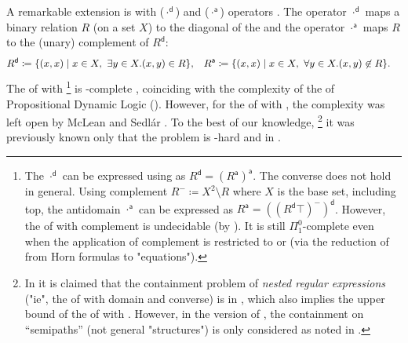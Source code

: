 \documentclass[10pt,a4paper]{article}
\theoremstyle{definition}
\theoremstyle{remark}
\DeclarePairedDelimiter\set{\{}{\}}
\DeclarePairedDelimiter\tuple{(}{)}
\newcommand{\bl}{\cdot}
\newcommand{\defeq}{\coloneq}
\newcommand{\dom}{\mathsf{d}}
\begin{document}
\begin{scope}
A remarkable extension is  with \reintro*{} ($\bl^{\mathsf{d}}$) and \intro*{} ($\bl^{\mathsf{a}}$) operators \cite{desharnaisKleeneAlgebraDomain2006,desharnaisModalSemiringsRevisited2008,desharnaisInternalAxiomsDomain2011}.
The  operator $\bl^{\mathsf{d}}$ maps a binary relation $R$ (on a set $X$) to the diagonal of the 
and the  operator $\bl^{\mathsf{a}}$ maps $R$ to the (unary) complement of $R^{\mathsf{d}}$:
\begin{align*}
  R^{\mathsf{d}} &\defeq \set{ \tuple{x,x} \mid x \in X,~ \exists y \in X. \tuple{x,y} \in R}, &
  R^{\mathsf{a}} &\defeq \set{ \tuple{x,x} \mid x \in X,~ \forall y \in X. \tuple{x,y} \not\in R}.
\end{align*}
%
The  of  with %
\footnote{\label{footnote: undecidable}%
The  $\bl^{\dom}$ can be expressed using  as $R^{\mathsf{d}} = (R^{\mathsf{a}})^{\mathsf{a}}$.
The converse does not hold in general.
Using complement $R^{-} \defeq X^2 \setminus R$ where $X$ is the base set, including top,
the antidomain $\bl^{\mathsf{a}}$ can be expressed as $R^{\mathsf{a}} = ((R^{\mathsf{d}} \top)^{-})^{\mathsf{d}}$.
However, the  of  with complement is undecidable (by \cite{hardinComplexityHornTheory2003}).
It is still $\Pi^{0}_{1}$-complete even when the application of complement is restricted to  \cite[Corollary 7.2]{nakamuraUndecidabilityEmptinessProblem2025} or  \cite[Theorem 50]{nakamuraExistentialCalculiRelations2023} (via the reduction of \cite[Example 3.4]{nakamuraUndecidabilityEmptinessProblem2025} from Horn formulas to "equations").}
is -complete \cite{sedlarComplexityKleeneAlgebra2023},
coinciding with the complexity of the  of Propositional Dynamic Logic ().
However, for the  of  with , the complexity was left open by McLean \cite[Problem 7.3]{mcleanFreeKleeneAlgebras2020} and Sedl{\'a}r \cite[p.~16]{sedlarKleeneAlgebraDynamic2023}.
To the best of our knowledge,%
\footnote{In \cite[unpublished manuscript]{reutterContainmentNestedRegular2013} 
it is claimed that the containment problem of \emph{nested regular expressions} \cite{perezNSPARQLNavigationalLanguage2008} ("ie", the  of  with domain and converse) is in ,
which also implies the  upper bound of the  of  with .
However, in the version of \cite{reutterContainmentNestedRegular2013}, the containment on ``semipaths'' (not general "structures") is only considered as noted in \cite[p.~1]{reutterContainmentNestedRegular2013}.}
it was previously known only that the problem is -hard \cite{meyerEquivalenceProblemRegular1972} and in  \cite{sedlarComplexityKleeneAlgebra2023}.


\end{scope}
\end{document}
